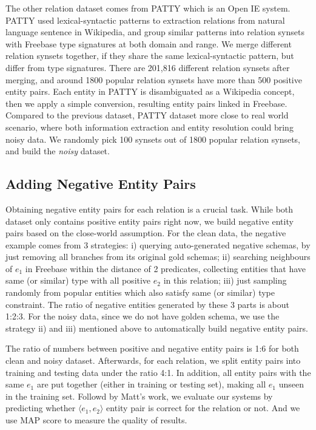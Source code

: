 The other relation dataset comes from PATTY \cite{nakashole2012patty} which is an Open IE system.
PATTY used lexical-syntactic patterns to extraction relations from natural
language sentence in Wikipedia, and group similar patterns into relation synsets with Freebase
type signatures at both domain and range.
We merge different relation synsets together, if they share the same lexical-syntactic
pattern, but differ from type signatures. 
There are 201,816 different relation synsets after merging, and around 1800 popular
relation synsets have more than 500 positive entity pairs.
Each entity in PATTY is disambiguated as a Wikipedia concept, then we apply a simple
conversion, resulting entity pairs linked in Freebase.
Compared to the previous dataset, PATTY dataset more close to real world scenario,
where both information extraction and entity resolution could bring noisy data.
We randomly pick 100 synsets out of 1800 popular relation synsets, and build the 
\textit{noisy} dataset.


\subsection{Adding Negative Entity Pairs}
Obtaining negative entity pairs for each relation is a crucial task.
While both dataset only contains positive entity pairs right now, we build 
negative entity pairs based on the close-world assumption.
For the clean data, the negative example comes from 3 strategies: i) querying auto-generated
negative schemas, by just removing all branches from its original gold schemas;
ii) searching neighbours of $e_1$ in Freebase within the distance of 2 predicates, 
collecting entities that have same (or similar) type with all positive $e_2$ in this relation;
iii) just sampling randomly from popular entities which also satisfy same (or similar) type constraint.
The ratio of negative entities generated by these 3 parts is about 1:2:3.
For the noisy data, since we do not have golden schema, we use the strategy ii) and iii)
mentioned above to automatically build negative entity pairs.

The ratio of numbers between positive and negative entity pairs is 1:6 for
both clean and noisy dataset. 
Afterwards, for each relation, we split entity pairs into training and testing data
under the ratio 4:1. In addition, all entity pairs with the same $e_1$ are put
together (either in training or testing set), making all $e_1$ unseen
in the training set. Followd by Matt's work, we evaluate our systems by predicting whether
$\langle e_1, e_2 \rangle$ entity pair is correct for the relation or not.
And we use MAP score to measure the quality of results.



